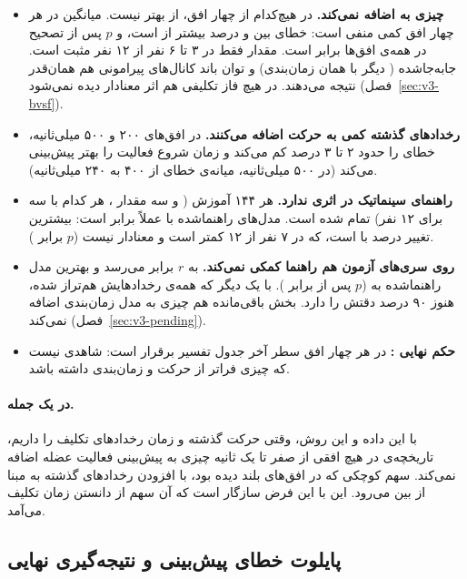 \begin{itemize}
\item \textbf{ چیزی به  اضافه نمی‌کند.} در هیچ‌کدام از چهار افق،  از  بهتر نیست. میانگین  در هر چهار افق کمی منفی است: خطای  بین  و  درصد بیشتر از  است، و $p$ پس از تصحیح  در همه‌ی افق‌ها برابر  است. مقدار  فقط در ۳ تا ۶ نفر از ۱۲ نفر مثبت است.  جابه‌جاشده ( دیگر با همان زمان‌بندی) و توان باند کانال‌های پیرامونی هم همان‌قدر نتیجه می‌دهند. در هیچ فاز تکلیفی هم اثر معنادار دیده نمی‌شود (فصل~\ref{sec:v3-bvsf}).
\item \textbf{رخدادهای گذشته کمی به حرکت اضافه می‌کنند.} در افق‌های ۲۰۰ و ۵۰۰ میلی‌ثانیه،  خطای  را حدود ۲ تا ۳ درصد کم می‌کند و زمان شروع فعالیت را بهتر پیش‌بینی می‌کند (در ۵۰۰ میلی‌ثانیه، میانه‌ی خطای  از ۴۰۰ به ۲۴۰ میلی‌ثانیه).
\item \textbf{راهنمای سینماتیک در  اثری ندارد.} هر ۱۴۴  آموزش ( و سه مقدار ، هر کدام با سه  برای ۱۲ نفر) تمام شده است.   مدل‌های راهنماشده با  عملاً برابر است: بیشترین تغییر  درصد با   است، که در ۷ نفر از ۱۲ کمتر است و معنادار نیست ($p$ برابر ).
\item \textbf{روی سری‌های آزمون هم راهنما کمکی نمی‌کند.}  به $r$ برابر  می‌رسد و بهترین مدل راهنماشده به  ($p$ پس از  برابر ). با  یک  دیگر که همه‌ی رخدادهایش هم‌تراز شده،  هنوز ۹۰ درصد دقتش را دارد. بخش باقی‌مانده هم چیزی به مدل زمان‌بندی  اضافه نمی‌کند (فصل~\ref{sec:v3-pending}).
\item \textbf{حکم نهایی :} در هر چهار افق سطر آخر جدول تفسیر برقرار است: شاهدی نیست که  چیزی فراتر از حرکت و زمان‌بندی داشته باشد.
\end{itemize}

\paragraph{در یک جمله.} با این داده و این روش، وقتی حرکت گذشته و زمان رخدادهای تکلیف را داریم، تاریخچه‌ی  در هیچ افقی از صفر تا یک ثانیه چیزی به پیش‌بینی فعالیت عضله اضافه نمی‌کند. سهم کوچکی که  در افق‌های بلند دیده بود، با افزودن رخدادهای گذشته به مبنا از بین می‌رود. این با این فرض سازگار است که آن سهم از دانستن زمان تکلیف می‌آمد.

\subsection{پایلوت خطای پیش‌بینی و نتیجه‌گیری نهایی}


